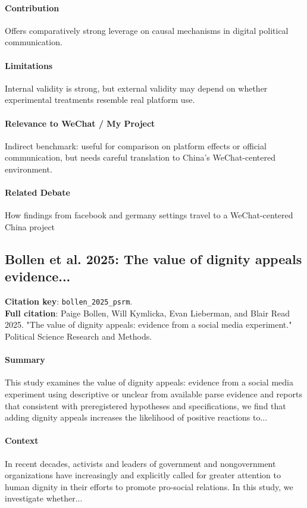\documentclass[12pt]{article}
\begin{document}
\paragraph{Contribution} Offers comparatively strong leverage on causal mechanisms in digital political communication.

\paragraph{Limitations} Internal validity is strong, but external validity may depend on whether experimental treatments resemble real platform use.

\paragraph{Relevance to WeChat / My Project} Indirect benchmark: useful for comparison on platform effects or official communication, but needs careful translation to China's WeChat-centered environment.

\paragraph{Related Debate} How findings from facebook and germany settings travel to a WeChat-centered China project


\subsection{Bollen et al. 2025: The value of dignity appeals evidence...}
\textbf{Citation key}: \texttt{bollen\_2025\_psrm}.\\
\textbf{Full citation}: Paige Bollen, Will Kymlicka, Evan Lieberman, and Blair Read 2025. "The value of dignity appeals: evidence from a social media experiment." Political Science Research and Methods.

\paragraph{Summary} This study examines the value of dignity appeals: evidence from a social media experiment using descriptive or unclear from available parse evidence and reports that consistent with preregistered hypotheses and specifications, we find that adding dignity appeals increases the likelihood of positive reactions to...

\paragraph{Context} In recent decades, activists and leaders of government and nongovernment organizations have increasingly and explicitly called for greater attention to human dignity in their efforts to promote pro-social relations. In this study, we investigate whether...
\end{document}
